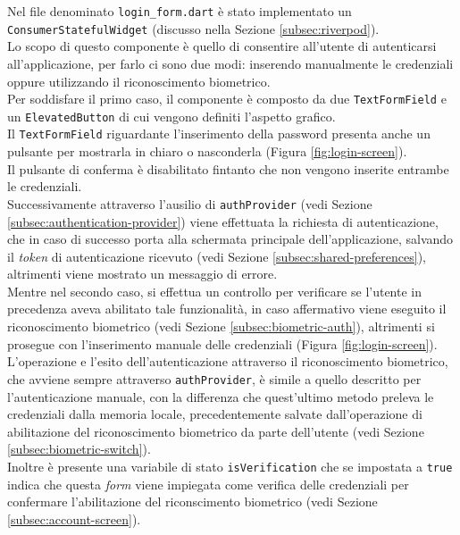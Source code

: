 Nel file denominato \lstinline{login_form.dart} è stato implementato un \lstinline{ConsumerStatefulWidget} (discusso nella Sezione \ref{subsec:riverpod}).\\
Lo scopo di questo componente è quello di consentire all'utente di autenticarsi all'applicazione, per farlo ci sono due modi: inserendo manualmente le credenziali oppure utilizzando il riconoscimento biometrico.\\
Per soddisfare il primo caso, il componente è composto da due \lstinline{TextFormField} \cite{site:text-form-field} e un \lstinline{ElevatedButton} \cite{site:elevated-button} di cui vengono definiti l'aspetto grafico.\\
Il \lstinline{TextFormField} riguardante l'inserimento della password presenta anche un pulsante per mostrarla in chiaro o nasconderla (Figura \ref{fig:login-screen}).\\
Il pulsante di conferma è disabilitato fintanto che non vengono inserite entrambe le credenziali.\\
Successivamente attraverso l'ausilio di \lstinline{authProvider} (vedi Sezione \ref{subsec:authentication-provider}) viene effettuata la richiesta di autenticazione, che in caso di successo porta alla schermata principale dell'applicazione, salvando il \emph{token} di autenticazione ricevuto (vedi Sezione \ref{subsec:shared-preferences}), altrimenti viene mostrato un messaggio di errore.\\ 
Mentre nel secondo caso, si effettua un controllo per verificare se l'utente in precedenza aveva abilitato tale funzionalità, in caso affermativo viene eseguito il riconoscimento biometrico (vedi Sezione \ref{subsec:biometric-auth}), altrimenti si prosegue con l'inserimento manuale delle credenziali (Figura \ref{fig:login-screen}).\\
L'operazione e l'esito dell'autenticazione attraverso il riconoscimento biometrico, che avviene sempre attraverso \lstinline{authProvider}, è simile a quello descritto per l'autenticazione manuale, con la differenza che quest'ultimo metodo preleva le credenziali dalla memoria locale, precedentemente salvate dall'operazione di abilitazione del riconoscimento biometrico da parte dell'utente (vedi Sezione \ref{subsec:biometric-switch}). \\
Inoltre è presente una variabile di stato \lstinline{isVerification} che se impostata a \lstinline{true} indica che questa \emph{form} viene impiegata come verifica delle credenziali per confermare l'abilitazione del riconscimento biometrico (vedi Sezione \ref{subsec:account-screen}).

